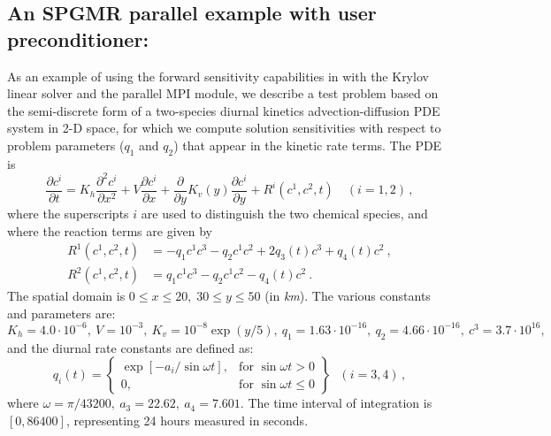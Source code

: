 \newpage
\subsection{An SPGMR parallel example with user preconditioner: }
\label{ss:pvfkx}

As an example of using the forward sensitivity capabilities in {\cvodes} 
with the Krylov linear solver {\cvspgmr} and the parallel MPI {\nvecp} module, 
we describe a test problem based on the
semi-discrete form of a two-species diurnal kinetics advection-diffusion PDE 
system in 2-D space, for which we compute solution sensitivities with respect to 
problem parameters ($q_1$ and $q_2$) that appear in the kinetic rate terms.
The PDE is
\begin{equation}\label{e:pvfkx_PDE}
  \frac{\partial c^i}{\partial t} = K_h\frac{\partial^2 c^i}{\partial x^2}
  +V \frac{\partial c^i}{\partial x}
  + \frac{\partial} {\partial y} K_v(y) \frac{\partial c^i}{\partial y}
  + R^i(c^1,c^2,t) \quad (i=1,2) \, ,
\end{equation}
where the superscripts $i$ are used to distinguish the two chemical
species, and where the reaction terms are given by
\begin{equation}\label{e:pvfkx_R}
  \begin{split}
    R^1(c^1,c^2,t) & = -q_1c^1c^3-q_2c^1c^2+2q_3(t)c^3+q_4(t)c^2 ~, \\
    R^2(c^1,c^2,t) & = q_1c^1c^3-q_2c^1c^2-q_4(t)c^2 ~.
  \end{split}
\end{equation}
The spatial domain is $0 \leq x \leq 20,\;30 \leq y \leq 50$ (in {\em km}). 
The various constants and parameters are: $K_h=4.0\cdot 10^{-6},
~ V=10^{-3},~ K_v=10^{-8}\exp (y/5),~ q_1=1.63\cdot 10^{-16},
~ q_2=4.66\cdot 10^{-16},~ c^3=3.7\cdot 10^{16},$ and the diurnal
rate constants are defined as:
\begin{equation*}
  q_i(t) = 
  \left\{ \begin{array}{ll}
      \exp [-a_i/\sin \omega t], & \mbox{for } \sin \omega t>0 \\
      0, & \mbox{for } \sin \omega t\leq 0
    \end{array} \right\} ~~~(i=3,4) \, ,
\end{equation*}
where $\omega =\pi /43200, ~ a_3=22.62,~ a_4=7.601.$  The time interval of
integration is $[0, 86400]$, representing 24 hours measured in seconds.

